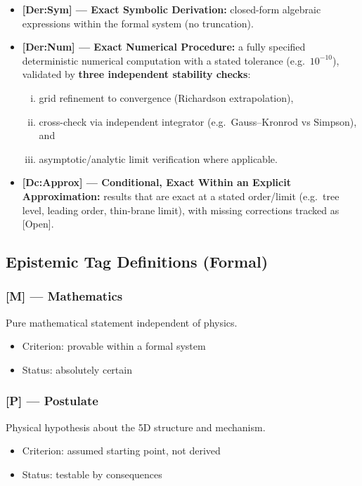 \begin{itemize}
\item \textbf{[Der:Sym] --- Exact Symbolic Derivation:}
closed-form algebraic expressions within the formal system (no truncation).

\item \textbf{[Der:Num] --- Exact Numerical Procedure:}
a fully specified deterministic numerical computation with a stated tolerance (e.g.\ $10^{-10}$),
validated by \textbf{three independent stability checks}:
\begin{enumerate}[(i)]
\item grid refinement to convergence (Richardson extrapolation),
\item cross-check via independent integrator (e.g.\ Gauss--Kronrod vs Simpson), and
\item asymptotic/analytic limit verification where applicable.
\end{enumerate}

\item \textbf{[Dc:Approx] --- Conditional, Exact Within an Explicit Approximation:}
results that are exact at a stated order/limit (e.g.\ tree level, leading order, thin-brane limit),
with missing corrections tracked as [Open].
\end{itemize}


\subsection*{Epistemic Tag Definitions (Formal)}

\subsubsection*{[M] --- Mathematics}
Pure mathematical statement independent of physics.
\begin{itemize}
\item Criterion: provable within a formal system
\item Status: absolutely certain
\end{itemize}

\subsubsection*{[P] --- Postulate}
Physical hypothesis about the 5D structure and mechanism.
\begin{itemize}
\item Criterion: assumed starting point, not derived
\item Status: testable by consequences
\end{itemize}

